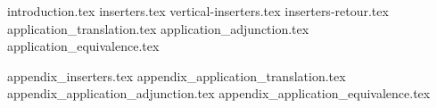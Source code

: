 \documentclass[acmsmall,anonymous,screen,review]{acmart}
\theoremstyle{acmdefinition}
\begin{document}



\maketitle


{introduction.tex}
{inserters.tex}
{vertical-inserters.tex}
{inserters-retour.tex}
{application_translation.tex}
{application_adjunction.tex}
{application_equivalence.tex}




\appendix
{appendix_inserters.tex}
{appendix_application_translation.tex}
{appendix_application_adjunction.tex}
{appendix_application_equivalence.tex}
\end{document}
